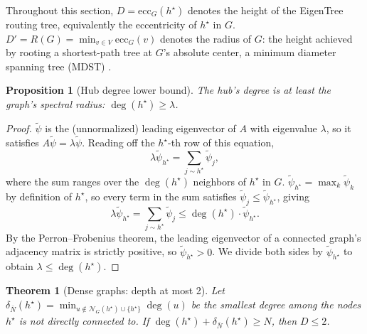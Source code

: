 \documentclass[letterpaper]{article} %
\newtheorem{proposition}{Proposition}
\newtheorem{theorem}{Theorem}
\begin{document}
Throughout this section, $D = \mathrm{ecc}_G(h^\star)$ denotes the height
of the EigenTree routing tree, equivalently the eccentricity of $h^\star$ in
$G$. $D' = R(G) = \min_{v\in V}\mathrm{ecc}_G(v)$ denotes the radius of
$G$: the height achieved by rooting a shortest-path tree at $G$'s absolute
center, a minimum diameter spanning tree (MDST) \citep{hakimi1964,hassintamir1995}.

\begin{proposition}[Hub degree lower bound]
\label{prop:hubdeg}
The hub's degree is at least the graph's spectral radius: $\deg(h^\star) \geq \lambda$.
\end{proposition}

\begin{proof}
$\tilde\psi$ is the (unnormalized) leading eigenvector of $A$ with
eigenvalue $\lambda$, so it satisfies $A\tilde\psi = \lambda\tilde\psi$.
Reading off the $h^\star$-th row of this equation,
\[
\lambda\tilde\psi_{h^\star} = \sum_{j \sim h^\star} \tilde\psi_j,
\]
where the sum ranges over the $\deg(h^\star)$ neighbors of $h^\star$ in
$G$. $\tilde\psi_{h^\star} = \max_k \tilde\psi_k$ by definition of
$h^\star$, so every term in the sum satisfies $\tilde\psi_j \leq
\tilde\psi_{h^\star}$, giving
\[
\lambda\tilde\psi_{h^\star} = \sum_{j\sim h^\star}\tilde\psi_j \leq \deg(h^\star)\cdot\tilde\psi_{h^\star}.
\]
By the Perron--Frobenius theorem, the leading eigenvector of a connected
graph's adjacency matrix is strictly positive, so $\tilde\psi_{h^\star} >
0$. We divide both sides by $\tilde\psi_{h^\star}$ to obtain $\lambda \leq
\deg(h^\star)$.
\end{proof}

\begin{theorem}[Dense graphs: depth at most 2]
\label{thm:mdst-gap}
Let $\delta_{\bar N}(h^\star) = \min_{u \notin \mathcal{N}_G(h^\star)\cup\{h^\star\}} \deg(u)$ be the smallest degree among the nodes $h^\star$ is not directly connected to. If $\deg(h^\star) + \delta_{\bar N}(h^\star) \geq N$, then $D \leq 2$.
\end{theorem}
\end{document}
